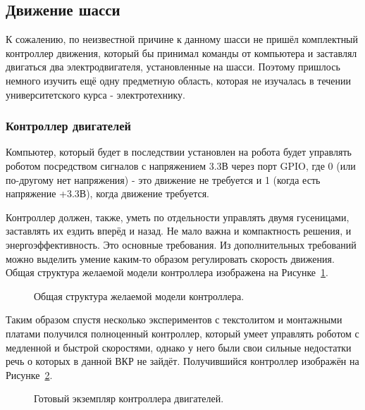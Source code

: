 \subsection{Движение шасси} \label{sub:robot-move}

К сожалению, по неизвестной причине к данному шасси не пришёл комплектный контроллер движения, который бы принимал команды от компьютера и заставлял двигаться два электродвигателя, установленные на шасси. Поэтому пришлось немного изучить ещё одну предметную область, которая не изучалась в течении университетского курса - электротехнику. 

\subsubsection{Контроллер двигателей}

Компьютер, который будет в последствии установлен на робота будет управлять роботом посредством сигналов с напряжением 3.3В через порт GPIO, где 0 (или по-другому нет напряжения) - это движение не требуется и 1 (когда есть напряжение +3.3В), когда движение требуется.

Контроллер должен, также, уметь по отдельности управлять двумя гусеницами, заставлять их ездить вперёд и назад. Не мало важна и компактность решения, и энергоэффективность. Это основные требования. Из дополнительных требований можно выделить умение каким-то образом регулировать скорость движения. Общая структура желаемой модели контроллера изображена на Рисунке~\ref{fig:structure-controller}. 

\begin{figure}[ht]
  \caption{Общая структура желаемой модели контроллера.}\label{fig:structure-controller}
\end{figure}

Таким образом спустя несколько экспериментов с текстолитом и монтажными платами получился полноценный контроллер, который умеет управлять роботом с медленной и быстрой скоростями, однако у него были свои сильные недостатки речь о которых в данной ВКР не зайдёт. Получившийся контроллер изображён на Рисунке~\ref{fig:robot-controller}.

\begin{figure}[ht]
  \caption{Готовый экземпляр контроллера двигателей.}\label{fig:robot-controller}
\end{figure}

